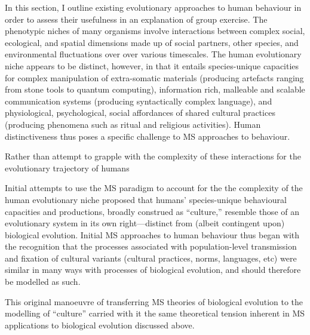 In this section, I outline existing evolutionary approaches to human behaviour in order to assess their usefulness in an explanation of group exercise.
The phenotypic niches of many organisms involve interactions between complex social,  ecological, and spatial dimensions made up of social partners, other species, and environmental fluctuations over over various timescales. The human evolutionary niche appears to be distinct, however, in that it entails species-unique capacities for complex manipulation of extra-somatic materials (producing artefacts ranging from stone tools to quantum computing), information rich, malleable and scalable communication systems (producing syntactically complex language), and physiological, psychological, social affordances of shared cultural practices (producing phenomena such as ritual and religious activities).  Human distinctiveness thus poses a specific challenge to MS approaches to behaviour.

Rather than attempt to grapple with the complexity of these interactions for the evolutionary trajectory of humans

Initial attempts to use the MS paradigm to account for the the complexity of the human evolutionary niche proposed that humans' species-unique behavioural capacities and productions, broadly construed as ``culture,'' resemble those of an evolutionary system in its own right---distinct from (albeit contingent upon) biological evolution.  Initial MS approaches to human behaviour thus began with the recognition that the processes associated with population-level transmission and fixation of cultural variants (cultural practices, norms, languages, etc) were similar in many ways with processes of biological evolution, and should therefore be modelled as such.

This original manoeuvre of transferring MS theories of biological evolution to the modelling of ``culture'' carried with it the same theoretical tension inherent in MS applications to biological evolution discussed above.



